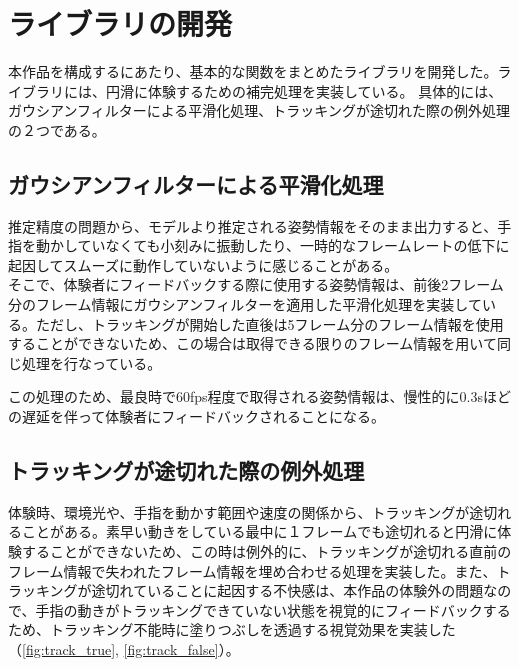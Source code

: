 \section{ライブラリの開発}
本作品を構成するにあたり、基本的な関数をまとめたライブラリを開発した。ライブラリには、円滑に体験するための補完処理を実装している。
具体的には、ガウシアンフィルターによる平滑化処理、トラッキングが途切れた際の例外処理の２つである。

\subsection{ガウシアンフィルターによる平滑化処理}
推定精度の問題から、モデルより推定される姿勢情報をそのまま出力すると、手指を動かしていなくても小刻みに振動したり、一時的なフレームレートの低下に起因してスムーズに動作していないように感じることがある。\\
そこで、体験者にフィードバックする際に使用する姿勢情報は、前後2フレーム分のフレーム情報にガウシアンフィルターを適用した平滑化処理を実装している。ただし、トラッキングが開始した直後は5フレーム分のフレーム情報を使用することができないため、この場合は取得できる限りのフレーム情報を用いて同じ処理を行なっている。


この処理のため、最良時で60fps程度で取得される姿勢情報は、慢性的に0.3sほどの遅延を伴って体験者にフィードバックされることになる。

\subsection{トラッキングが途切れた際の例外処理}
体験時、環境光や、手指を動かす範囲や速度の関係から、トラッキングが途切れることがある。素早い動きをしている最中に１フレームでも途切れると円滑に体験することができないため、この時は例外的に、トラッキングが途切れる直前のフレーム情報で失われたフレーム情報を埋め合わせる処理を実装した。また、トラッキングが途切れていることに起因する不快感は、本作品の体験外の問題なので、手指の動きがトラッキングできていない状態を視覚的にフィードバックするため、トラッキング不能時に塗りつぶしを透過する視覚効果を実装した（\ref{fig:track_true}, \ref{fig:track_false}）。


